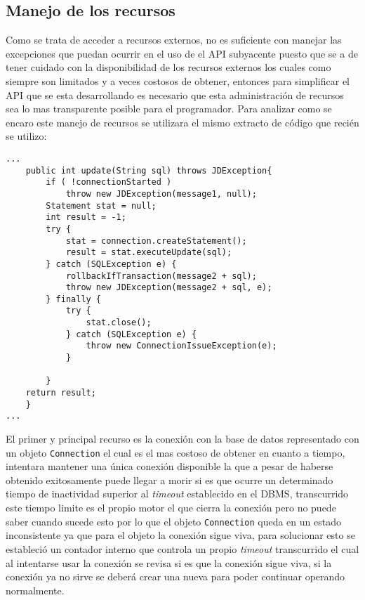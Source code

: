 \subsection{Manejo de los recursos}
Como \jd se trata de acceder a recursos externos, no es suficiente con manejar las excepciones que puedan ocurrir en el uso de el API subyacente puesto que se a de tener cuidado con la disponibilidad de los recursos externos los cuales como siempre son limitados y a veces costosos de obtener, entonces para simplificar el API que se esta desarrollando es necesario que esta administración de recursos sea lo mas transparente posible para el programador. Para analizar como se encaro este manejo de recursos se utilizara el mismo extracto de código que recién se utilizo:
%
\begin{lstlisting}[title=función extraída de JDBCManager]
...
	public int update(String sql) throws JDException{
		if ( !connectionStarted ) 
			throw new JDException(message1, null);
		Statement stat = null;
		int result = -1;
		try {
			stat = connection.createStatement();
			result = stat.executeUpdate(sql);
		} catch (SQLException e) {
			rollbackIfTransaction(message2 + sql);
			throw new JDException(message2 + sql, e);
		} finally {
			try {
				stat.close();
			} catch (SQLException e) {
				throw new ConnectionIssueException(e);
			}
			
		}
	return result; 
	}
...
\end{lstlisting}
%
El primer y principal recurso es la conexión con la base de datos representado con un objeto \verb=Connection= el cual es el mas costoso de obtener en cuanto a tiempo, \jd intentara mantener una única conexión disponible la que a pesar de haberse obtenido exitosamente puede llegar a morir si es que ocurre un determinado tiempo de inactividad superior al \textit{timeout} establecido en el DBMS, transcurrido este tiempo limite es el propio motor el que cierra la conexión pero \jd no puede saber cuando sucede esto por lo que el objeto \verb=Connection= queda en un estado inconsistente ya que para el objeto la conexión sigue viva, para solucionar esto se estableció un contador interno que controla un propio \textit{timeout} transcurrido el cual al intentarse usar la conexión se revisa si es que la conexión sigue viva, si la conexión ya no sirve se deberá crear una nueva para poder continuar operando normalmente.

